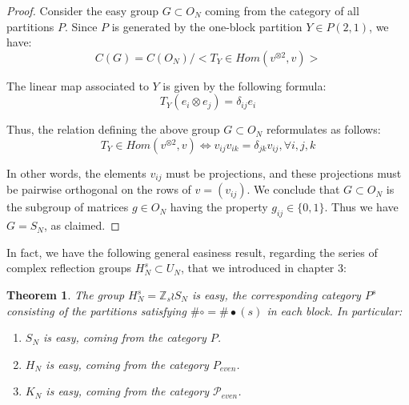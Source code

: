\documentclass[12pt]{amsbook}
\newtheorem{theorem}{Theorem}[chapter]
\begin{document}
\begin{proof}
Consider the easy group $G\subset O_N$ coming from the category of all partitions $P$. Since $P$ is generated by the one-block partition $Y\in P(2,1)$, we have:
$$C(G)=C(O_N)\Big/\Big<T_Y\in Hom(v^{\otimes 2},v)\Big>$$

The linear map associated to $Y$ is given by the following formula:
$$T_Y(e_i\otimes e_j)=\delta_{ij}e_i$$

Thus, the relation defining the above group $G\subset O_N$ reformulates as follows:
$$T_Y\in Hom(v^{\otimes 2},v)\iff v_{ij}v_{ik}=\delta_{jk}v_{ij},\forall i,j,k$$

In other words, the elements $v_{ij}$ must be projections, and these projections must be pairwise orthogonal on the rows of $v=(v_{ij})$. We conclude that $G\subset O_N$ is the subgroup of matrices $g\in O_N$ having the property $g_{ij}\in\{0,1\}$. Thus we have $G=S_N$, as claimed. 
\end{proof}

In fact, we have the following general easiness result, regarding the series of complex reflection groups $H_N^s\subset U_N$, that we introduced in chapter 3:


\begin{theorem}
The group $H_N^s=\mathbb Z_s\wr S_N$ is easy, the corresponding category $P^s$ consisting of the partitions satisfying $\#\circ=\#\bullet(s)$ in each block. In particular:
\begin{enumerate}
\item $S_N$ is easy, coming from the category $P$.

\item $H_N$ is easy, coming from the category $P_{even}$.

\item $K_N$ is easy, coming from the category $\mathcal P_{even}$.
\end{enumerate}
\end{theorem}
\end{document}
